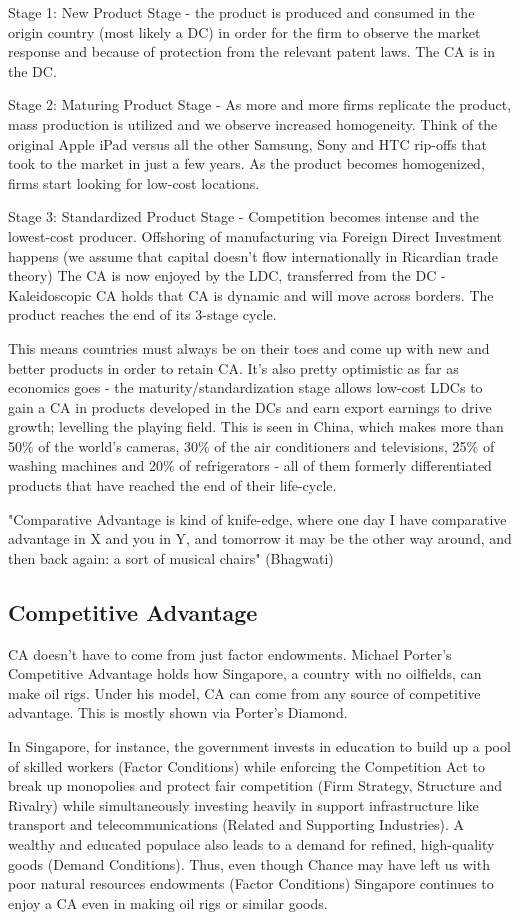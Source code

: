 Stage 1: New Product Stage - the product is produced and consumed in the origin country (most likely a DC) in order for the firm to observe the market response and because of protection from the relevant patent laws. The CA is in the DC.

Stage 2: Maturing Product Stage - As more and more firms replicate the product, mass production is utilized and we observe increased homogeneity. Think of the original Apple iPad versus all the other Samsung, Sony and HTC rip-offs that took to the market in just a few years. As the product becomes homogenized, firms start looking for low-cost locations.

Stage 3: Standardized Product Stage - Competition becomes intense and the lowest-cost producer. Offshoring of manufacturing via Foreign Direct Investment happens (we assume that capital doesn't flow internationally in Ricardian trade theory) The CA is now enjoyed by the LDC, transferred from the DC - Kaleidoscopic CA holds that CA is dynamic and will move across borders. The product reaches the end of its 3-stage cycle.

This means countries must always be on their toes and come up with new and better products in order to retain CA. It's also pretty optimistic as far as economics goes - the maturity/standardization stage allows low-cost LDCs to gain a CA in products developed in the DCs and earn export earnings to drive growth; levelling the playing field. This is seen in China, which makes more than 50\% of the world's cameras, 30\% of the air conditioners and televisions, 25\% of washing machines and 20\% of refrigerators - all of them formerly differentiated products that have reached the end of their life-cycle.

"Comparative Advantage is kind of knife-edge, where one day I have comparative advantage in X and you in Y, and tomorrow it may be the other way around, and then back again: a sort of musical chairs" (Bhagwati)
\subsection{Competitive Advantage}
CA doesn't have to come from just factor endowments. Michael Porter's Competitive Advantage holds how Singapore, a country with no oilfields, can make oil rigs. Under his model, CA can come from any source of competitive advantage. This is mostly shown via Porter's Diamond.

In Singapore, for instance, the government invests in education to build up a pool of skilled workers (Factor Conditions) while enforcing the Competition Act to break up monopolies and protect fair competition (Firm Strategy, Structure and Rivalry) while simultaneously investing heavily in support infrastructure like transport and telecommunications (Related and Supporting Industries). A wealthy and educated populace also leads to a demand for refined, high-quality goods (Demand Conditions). Thus, even though Chance may have left us with poor natural resources endowments (Factor Conditions) Singapore continues to enjoy a CA even in making oil rigs or similar goods.
